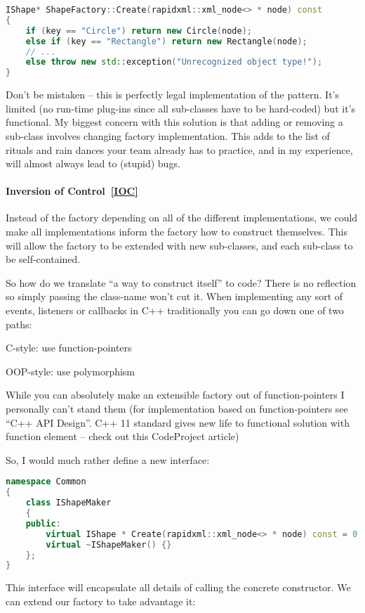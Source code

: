 \documentclass{book}
\begin{document}
\begin{lstlisting}[caption={Abstract Factory Pattern sample 2 legal solution}, language=C++]
IShape* ShapeFactory::Create(rapidxml::xml_node<> * node) const
{
    if (key == "Circle") return new Circle(node);
    else if (key == "Rectangle") return new Rectangle(node);
    // ...
    else throw new std::exception("Unrecognized object type!");
}
\end{lstlisting}
Don’t be mistaken – this is perfectly legal implementation of the pattern.
It’s limited (no run-time plug-ins since all sub-classes have to be hard-coded) but it’s functional.
My biggest concern with this solution is that adding or removing a sub-class involves changing factory implementation.
This adds to the list of rituals and rain dances your team already has to practice, and in my experience, will almost always lead to (stupid) bugs.

\paragraph{Inversion of Control~\ref{IOC}}

Instead of the factory depending on all of the different implementations, we could make all implementations inform the factory how to construct themselves.
This will allow the factory to be extended with new sub-classes, and each sub-class to be self-contained.

So how do we translate “a way to construct itself” to code? There is no reflection so simply passing the class-name won’t cut it.
When implementing any sort of events, listeners or callbacks in C++ traditionally you can go down one of two paths:

    C-style: use function-pointers

    OOP-style: use polymorphism

While you can absolutely make an extensible factory out of function-pointers I personally can’t stand them (for implementation based on function-pointers see “C++ API Design”.
C++ 11 standard gives new life to functional solution with function element – check out this CodeProject article)

So, I would much rather define a new interface:

\begin{lstlisting}[caption={Abstract Factory Pattern sample 2-2}, language=C++]
namespace Common
{
    class IShapeMaker
    {
    public:
        virtual IShape * Create(rapidxml::xml_node<> * node) const = 0;
        virtual ~IShapeMaker() {}
    };
}
\end{lstlisting}
This interface will encapsulate all details of calling the concrete constructor. We can extend our factory to take advantage it:
\end{document}
